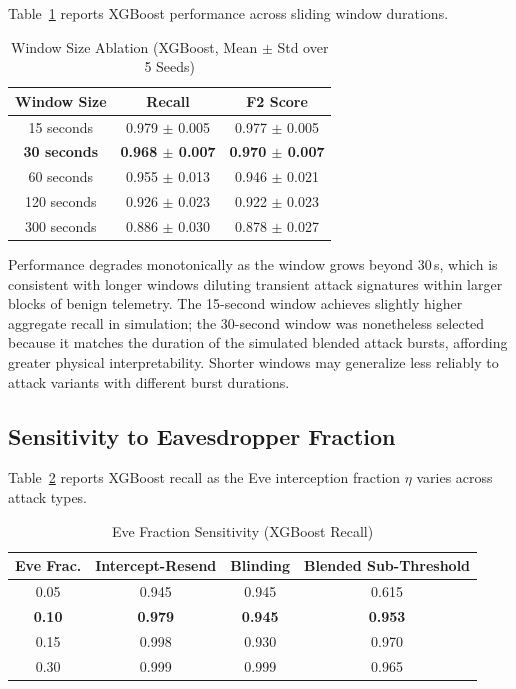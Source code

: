 \documentclass[conference]{IEEEtran}
\begin{document}
Table~\ref{tab:window_ablation} reports XGBoost performance across sliding window durations.

\begin{table}[htbp]
\caption{Window Size Ablation (XGBoost, Mean $\pm$ Std over 5 Seeds)}
\label{tab:window_ablation}
\centering
\begin{tabular}{ccc}
\toprule
\textbf{Window Size} & \textbf{Recall} & \textbf{F2 Score} \\
\midrule
15 seconds          & 0.979 $\pm$ 0.005 & 0.977 $\pm$ 0.005 \\
\textbf{30 seconds} & \textbf{0.968 $\pm$ 0.007} & \textbf{0.970 $\pm$ 0.007} \\
60 seconds          & 0.955 $\pm$ 0.013 & 0.946 $\pm$ 0.021 \\
120 seconds         & 0.926 $\pm$ 0.023 & 0.922 $\pm$ 0.023 \\
300 seconds         & 0.886 $\pm$ 0.030 & 0.878 $\pm$ 0.027 \\
\bottomrule
\end{tabular}
\end{table}

Performance degrades monotonically as the window grows beyond 30\,s, which is consistent with longer windows diluting transient attack signatures within larger blocks of benign telemetry. The 15-second window achieves slightly higher aggregate recall in simulation; the 30-second window was nonetheless selected because it matches the duration of the simulated blended attack bursts, affording greater physical interpretability. Shorter windows may generalize less reliably to attack variants with different burst durations.

\subsection{Sensitivity to Eavesdropper Fraction}

Table~\ref{tab:eve_fraction} reports XGBoost recall as the Eve interception fraction $\eta$ varies across attack types.

\begin{table}[htbp]
\caption{Eve Fraction Sensitivity (XGBoost Recall)}
\label{tab:eve_fraction}
\centering
\begin{tabular}{cccc}
\toprule
\textbf{Eve Frac.} & \textbf{Intercept-Resend} & \textbf{Blinding} & \textbf{Blended Sub-Threshold} \\
\midrule
0.05        & 0.945 & 0.945 & 0.615 \\
\textbf{0.10} & \textbf{0.979} & \textbf{0.945} & \textbf{0.953} \\
0.15        & 0.998 & 0.930 & 0.970 \\
0.30        & 0.999 & 0.999 & 0.965 \\
\bottomrule
\end{tabular}
\end{table}
\end{document}
